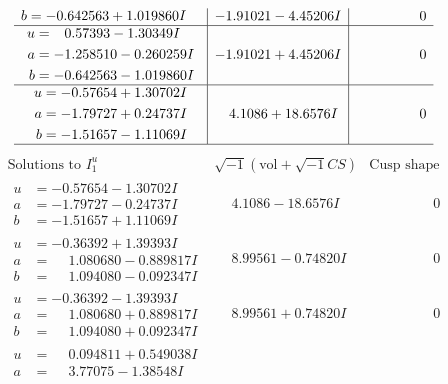 \documentclass[1p]{elsarticle_modified}
\theoremstyle{definition}
\newcommand{\I}{\sqrt{-1}}
\begin{document}
$$\begin{array}{c|c|c}
\begin{aligned}
b &= -0.642563 + 1.019860 I\end{aligned}
 & -1.91021 - 4.45206 I & \phantom{-0.000000 } 0 \\ \hline\begin{aligned}
u &= \phantom{-}0.57393 - 1.30349 I \\
a &= -1.258510 - 0.260259 I \\
b &= -0.642563 - 1.019860 I\end{aligned}
 & -1.91021 + 4.45206 I & \phantom{-0.000000 } 0 \\ \hline\begin{aligned}
u &= -0.57654 + 1.30702 I \\
a &= -1.79727 + 0.24737 I \\
b &= -1.51657 - 1.11069 I\end{aligned}
 & \phantom{-}4.1086 + 18.6576 I & \phantom{-0.000000 } 0\\
 \hline 
 \end{array}$$\newpage$$\begin{array}{c|c|c}  
\text{Solutions to }I^u_{1}& \I (\text{vol} + \sqrt{-1}CS) & \text{Cusp shape}\\
 \hline 
\begin{aligned}
u &= -0.57654 - 1.30702 I \\
a &= -1.79727 - 0.24737 I \\
b &= -1.51657 + 1.11069 I\end{aligned}
 & \phantom{-}4.1086 - 18.6576 I & \phantom{-0.000000 } 0 \\ \hline\begin{aligned}
u &= -0.36392 + 1.39393 I \\
a &= \phantom{-}1.080680 - 0.889817 I \\
b &= \phantom{-}1.094080 - 0.092347 I\end{aligned}
 & \phantom{-}8.99561 - 0.74820 I & \phantom{-0.000000 } 0 \\ \hline\begin{aligned}
u &= -0.36392 - 1.39393 I \\
a &= \phantom{-}1.080680 + 0.889817 I \\
b &= \phantom{-}1.094080 + 0.092347 I\end{aligned}
 & \phantom{-}8.99561 + 0.74820 I & \phantom{-0.000000 } 0 \\ \hline\begin{aligned}
u &= \phantom{-}0.094811 + 0.549038 I \\
a &= \phantom{-}3.77075 - 1.38548 I \\

\end{aligned}
\end{array}$$
\end{document}

